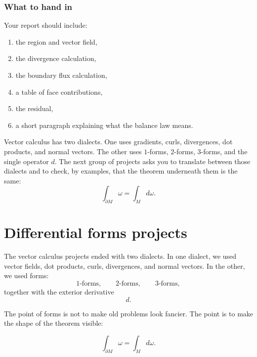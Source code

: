 \subsubsection*{What to hand in}

Your report should include:

\begin{enumerate}
\item the region and vector field,

\item the divergence calculation,

\item the boundary flux calculation,

\item a table of face contributions,

\item the residual,

\item a short paragraph explaining what the balance law means.
\end{enumerate}

Vector calculus has two dialects.  One uses gradients, curls, divergences, dot products,
and normal vectors.  The other uses \(1\)-forms, \(2\)-forms, \(3\)-forms, and the single
operator \(d\).  The next group of projects asks you to translate between those dialects
and to check, by examples, that the theorem underneath them is the same:
\[
    \int_{\partial M}\omega=\int_M d\omega.
\]

\section{Differential forms projects}
\label{sec:20.5}

The vector calculus projects ended with two dialects.  In one dialect, we used vector
fields, dot products, curls, divergences, and normal vectors.  In the other, we used
forms:
\[
    1\text{-forms},\qquad 2\text{-forms},\qquad 3\text{-forms},
\]
together with the exterior derivative
\[
    d.
\]

The point of forms is not to make old problems look fancier.  The point is to make the
shape of the theorem visible:

\[
\boxed{
    \int_{\partial M}\omega=\int_M d\omega.
}
\]

